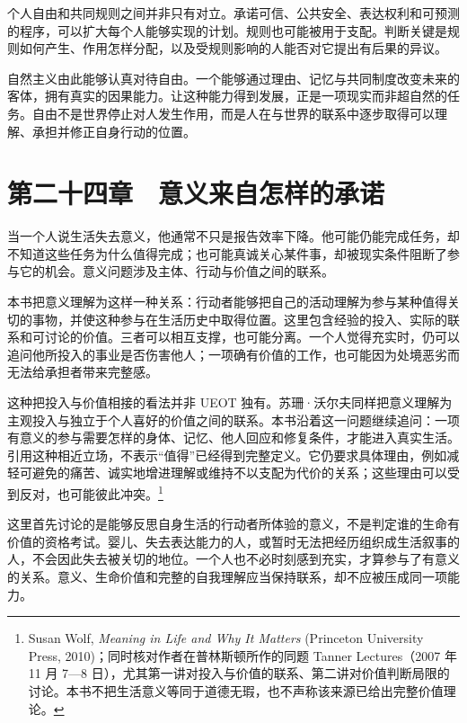 \documentclass[
  11pt,
  oneside]{book}
\begin{document}
个人自由和共同规则之间并非只有对立。承诺可信、公共安全、表达权利和可预测的程序，可以扩大每个人能够实现的计划。规则也可能被用于支配。判断关键是规则如何产生、作用怎样分配，以及受规则影响的人能否对它提出有后果的异议。

\begingroup{}

自然主义由此能够认真对待自由。一个能够通过理由、记忆与共同制度改变未来的客体，拥有真实的因果能力。让这种能力得到发展，正是一项现实而非超自然的任务。自由不是世界停止对人发生作用，而是人在与世界的联系中逐步取得可以理解、承担并修正自身行动的位置。

\par\endgroup

\chapter{第二十四章　意义来自怎样的承诺}\label{ph-ch-24}

当一个人说生活失去意义，他通常不只是报告效率下降。他可能仍能完成任务，却不知道这些任务为什么值得完成；也可能真诚关心某件事，却被现实条件阻断了参与它的机会。意义问题涉及主体、行动与价值之间的联系。

本书把意义理解为这样一种关系：行动者能够把自己的活动理解为参与某种值得关切的事物，并使这种参与在生活历史中取得位置。这里包含经验的投入、实际的联系和可讨论的价值。三者可以相互支撑，也可能分离。一个人觉得充实时，仍可以追问他所投入的事业是否伤害他人；一项确有价值的工作，也可能因为处境恶劣而无法给承担者带来完整感。

这种把投入与价值相接的看法并非 UEOT 独有。苏珊·沃尔夫同样把意义理解为主观投入与独立于个人喜好的价值之间的联系。本书沿着这一问题继续追问：一项有意义的参与需要怎样的身体、记忆、他人回应和修复条件，才能进入真实生活。引用这种相近立场，不表示``值得''已经得到完整定义。它仍要求具体理由，例如减轻可避免的痛苦、诚实地增进理解或维持不以支配为代价的关系；这些理由可以受到反对，也可能彼此冲突。\footnote{\hypertarget{ph-note-56}{}Susan Wolf, \emph{Meaning in Life and Why It Matters} (Princeton University Press, 2010)；同时核对作者在普林斯顿所作的同题 Tanner Lectures（2007 年 11 月 7---8 日），尤其第一讲对投入与价值的联系、第二讲对价值判断局限的讨论。本书不把生活意义等同于道德无瑕，也不声称该来源已给出完整价值理论。}

这里首先讨论的是能够反思自身生活的行动者所体验的意义，不是判定谁的生命有价值的资格考试。婴儿、失去表达能力的人，或暂时无法把经历组织成生活叙事的人，不会因此失去被关切的地位。一个人也不必时刻感到充实，才算参与了有意义的关系。意义、生命价值和完整的自我理解应当保持联系，却不应被压成同一项能力。
\end{document}
